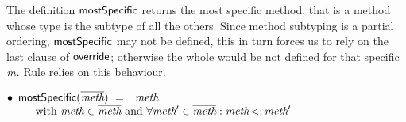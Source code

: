 \noindent The definition $\textsf{mostSpecific}$ returns the most
specific method, that is a method whose type is the subtype of all the
others.  Since method subtyping is a partial ordering,
$\textsf{mostSpecific}$ may not be defined, this in turn forces us to rely on the last clause of $\textsf{override}$; otherwise
the whole \mBody{} would be not defined for that specific $\textit{m}$.
Rule  relies on this behaviour.

\noindent$\begin{array}{l}
\InTextDef{18ex}{\Aux{mostSpecific}(\methods)}{\method}\\
\InTextWith{\method \in \methods\ \mand\ \forall \method' \in \methods :  \method \subtype \method'}
\end{array}$


%
%

\begin{comment}
We abbreviate typing statements on
sequences in a simple way, writing $\Gamma \vdash \overline{t}:\overline{C}$ as
shorthand for $\Gamma \vdash t_1:C_1,..., \Gamma \vdash t_n:C_n$.
\end{comment}



